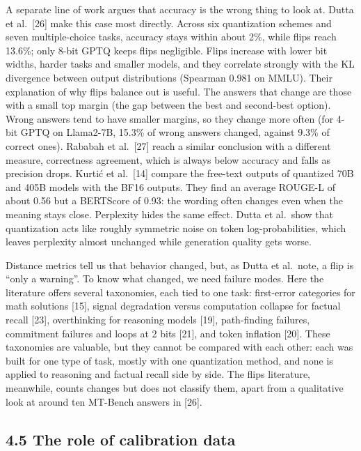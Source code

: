 \documentclass[10pt,twocolumn]{article}
\begin{document}
A separate line of work argues that accuracy is the wrong thing to look
at. Dutta et al.~[26] make this case most directly. Across six
quantization schemes and seven multiple-choice tasks, accuracy stays
within about 2\%, while flips reach 13.6\%; only 8-bit GPTQ keeps flips
negligible. Flips increase with lower bit widths, harder tasks and
smaller models, and they correlate strongly with the KL divergence
between output distributions (Spearman 0.981 on MMLU). Their explanation
of why flips balance out is useful. The answers that change are those
with a small top margin (the gap between the best and second-best
option). Wrong answers tend to have smaller margins, so they change more
often (for 4-bit GPTQ on Llama2-7B, 15.3\% of wrong answers changed,
against 9.3\% of correct ones). Rababah et al.~[27] reach a similar
conclusion with a different measure, correctness agreement, which is
always below accuracy and falls as precision drops. Kurtić et al.~[14]
compare the free-text outputs of quantized 70B and 405B models with the
BF16 outputs. They find an average ROUGE-L of about 0.56 but a
BERTScore of 0.93: the wording often changes even when the meaning stays
close. Perplexity hides the same effect. Dutta et al.~show that
quantization acts like roughly symmetric noise on token
log-probabilities, which leaves perplexity almost unchanged while
generation quality gets worse.

Distance metrics tell us that behavior changed, but, as Dutta et
al.~note, a flip is ``only a warning''. To know what changed, we need
failure modes. Here the literature offers several taxonomies, each tied
to one task: first-error categories for math solutions [15], signal
degradation versus computation collapse for factual recall [23],
overthinking for reasoning models [19], path-finding failures,
commitment failures and loops at 2 bits [21], and token inflation [20].
These taxonomies are valuable, but they cannot be compared with each
other: each was built for one type of task, mostly with one quantization
method, and none is applied to reasoning and factual recall side by
side. The flips literature, meanwhile, counts changes but does not
classify them, apart from a qualitative look at around ten MT-Bench
answers in [26].

\subsection{4.5 The role of calibration data}
\end{document}
